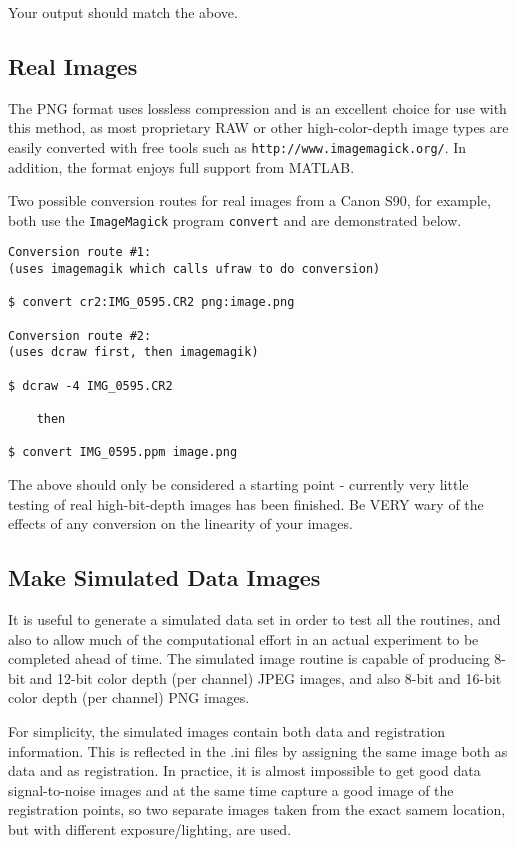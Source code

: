 Your output should match the above.

\subsection{Real Images}

The PNG format uses lossless compression and is an excellent choice for use with this method, as most proprietary RAW or other high-color-depth image types are easily converted with free tools such as \texttt{http://www.imagemagick.org/}.  In addition, the format enjoys full support from MATLAB.

Two possible conversion routes for real images from a Canon S90, for example, both use the \texttt{ImageMagick} program \texttt{convert} and are demonstrated below.

\begin{verbatim} 
Conversion route #1: 
(uses imagemagik which calls ufraw to do conversion)

$ convert cr2:IMG_0595.CR2 png:image.png
  
Conversion route #2:
(uses dcraw first, then imagemagik)

$ dcraw -4 IMG_0595.CR2

    then

$ convert IMG_0595.ppm image.png
\end{verbatim}

The above should only be considered a starting point - currently very little testing of real high-bit-depth images has been finished.  Be VERY wary of the effects of any conversion on the linearity of your images.

\subsection{Make Simulated Data Images}

It is useful to generate a simulated data set in order to test all the routines, and also to allow much of the computational effort in an actual experiment to be completed ahead of time.  The simulated image routine is capable of producing 8-bit and 12-bit color depth (per channel) JPEG images, and also 8-bit and 16-bit color depth (per channel) PNG images.  

For simplicity, the simulated images contain both data and registration information.  This is reflected in the .ini files by assigning the same image both as data and as registration.  In practice, it is almost impossible to get good data signal-to-noise images and at the same time capture a good image of the registration points, so two separate images taken from the exact samem location, but with different exposure/lighting, are used.

